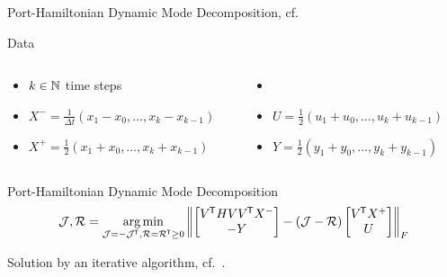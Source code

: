 \begin{frame}{Port-Hamiltonian Dynamic Mode Decomposition, cf.~\cite{Morandin2022}}
    \begin{block}{Data}
        \begin{columns}[totalwidth=\linewidth]
            \begin{column}{.49\textwidth}
                \begin{itemize}
                    \item $k \in \bb{N}$ time steps
                    \item $X^- = \frac{1}{\Delta t} \left( x_1 - x_0, \dots, x_k - x_{k - 1} \right)$
                    \item $X^+ = \frac{1}{2} \left( x_1 + x_0, \dots, x_k + x_{k - 1} \right)$
                \end{itemize}
            \end{column}
            \begin{column}{.49\textwidth}
                \begin{itemize}
                    \item[] \phantom{}
                    \item $U = \frac{1}{2} \left( u_1 + u_0, \dots, u_k + u_{k - 1} \right)$
                    \item $Y = \frac{1}{2} \left( y_1 + y_0, \dots, y_k + y_{k - 1} \right)$
                \end{itemize}
            \end{column}
        \end{columns}
    \end{block}

    \begin{block}{\color{petrol}Port-Hamiltonian Dynamic Mode Decomposition}
        \begin{equation*}
            \mcl{J}, \mcl{R} = \argmin\limits_{\mcl{J} = -\mcl{J}\trans, \mcl{R} = \mcl{R}\trans \geq 0} \norm[F]{\begin{bmatrix}
                V\trans H V V\trans X^- \\
                -Y
            \end{bmatrix} - \left( \mcl{J} - \mcl{R} \right) \begin{bmatrix}
                V\trans X^+ \\
                U
            \end{bmatrix}}
        \end{equation*}
    \end{block}

    Solution by an iterative algorithm, cf.~\cite{Morandin2022}.
\end{frame}